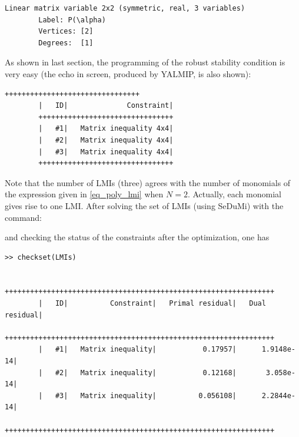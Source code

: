 \documentclass[english,11pt]{article}
\theoremstyle{break} \theorembodyfont{\small\rm}
\begin{document}
\begin{minipage}{13.5cm}
	\begin{lstlisting}[rulecolor=\color{red}]
		Linear matrix variable 2x2 (symmetric, real, 3 variables)
		Label: P(\alpha)
		Vertices: [2]
		Degrees:  [1]
	\end{lstlisting}
\end{minipage}

As shown in last section, the programming of the robust stability condition is very easy (the echo in screen, produced by YALMIP, is also shown):

\vspace{0.5cm}
\begin{minipage}{20.5cm}
\end{minipage}

\begin{minipage}{9.2cm}
	\begin{lstlisting}[rulecolor=\color{red}]
		++++++++++++++++++++++++++++++++
		|   ID|              Constraint|
		++++++++++++++++++++++++++++++++
		|   #1|   Matrix inequality 4x4|
		|   #2|   Matrix inequality 4x4|
		|   #3|   Matrix inequality 4x4|
		++++++++++++++++++++++++++++++++
	\end{lstlisting}
\end{minipage}


Note that the number of LMIs (three) agrees with the number of monomials  of the expression given in \eqref{eq_poly_lmi} when $N=2$. Actually, each monomial gives rise to one LMI. After solving the set of LMIs (using SeDuMi) with the command:

\vspace{0.5cm}
\begin{minipage}{20.5cm}
\end{minipage}
\vspace{0.2cm}

\noindent and checking the status of the constraints after the optimization, one has

\begin{minipage}{15.0cm}
	\begin{lstlisting}[rulecolor=\color{red}]
		>> checkset(LMIs)

		++++++++++++++++++++++++++++++++++++++++++++++++++++++++++++++++
		|   ID|          Constraint|   Primal residual|   Dual residual|
		++++++++++++++++++++++++++++++++++++++++++++++++++++++++++++++++
		|   #1|   Matrix inequality|           0.17957|      1.9148e-14|
		|   #2|   Matrix inequality|           0.12168|       3.058e-14|
		|   #3|   Matrix inequality|          0.056108|      2.2844e-14|
		++++++++++++++++++++++++++++++++++++++++++++++++++++++++++++++++
	\end{lstlisting}
\end{minipage}
\end{document}
